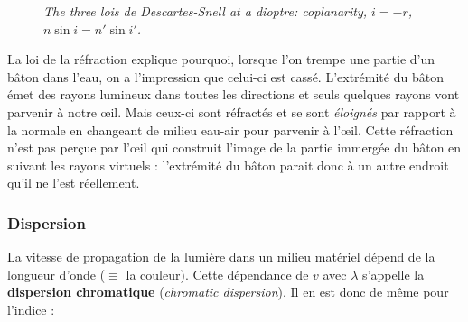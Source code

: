 \begin{figure}[h!]
  \centering

  \smallskip
  {\small\itshape The three lois de Descartes-Snell at a dioptre: coplanarity,
  $i=-r$, $n \sin i = n' \sin i'$.}
\end{figure}

\begin{example}
  La loi de la réfraction explique pourquoi, lorsque l'on trempe une partie d'un
  bâton dans l'eau, on a l'impression que celui-ci est cassé. L'extrémité du
  bâton émet des rayons lumineux dans toutes les directions et seuls quelques
  rayons vont parvenir à notre œil. Mais ceux-ci sont réfractés et se sont
  \emph{éloignés} par rapport à la normale en changeant de milieu eau-air pour
  parvenir à l'œil. Cette réfraction n'est pas perçue par l'œil qui construit
  l'image de la partie immergée du bâton en suivant les rayons virtuels :
  l'extrémité du bâton parait donc à un autre endroit qu'il ne l'est réellement.
\end{example}

\subsubsection{Dispersion}

La vitesse de propagation de la lumière dans un milieu matériel dépend de la
longueur d'onde ($\equiv$ la couleur). Cette dépendance de $v$ avec $\lambda$
s'appelle la \textbf{dispersion chromatique} (\textit{chromatic dispersion}). Il
en est donc de même pour l'indice :

